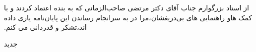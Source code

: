 


\begin{center}
\end{center}

از استاد بزرگوارم جناب آقای دکتر مرتضی صاحب‌الزمانی ‫ﮐﻪ‬ ‫ﺑﻪ‬ ‫ﺑﻨﺪﻩ‬ ‫ﺍﻋﺘﻤﺎﺩ‬ ‫ﮐﺮﺩﻧﺪ‬ ‫ﻭ‬ ‫ﺑﺎ‬ ‫ﮐﻤﮏ‬ ‫ﻫﺎ‬‫ﻭ‬ ‫ﺭﺍﻫﻨﻤﺎﯾﯽ‬ ‫ﻫﺎﯼ‬
‫ﺑﯽ‬‫ﺩﺭﯾﻐﺸﺎﻥ‪،‬‬‫ﻣﺮﺍ‬ ‫ﺩﺭ‬ ‫ﺑﻪ‬ ‫ﺳﺮﺍﻧﺠﺎﻡ‬ ‫ﺭﺳﺎﻧﺪﻥ‬ ‫ﺍﯾﻦ‬ ‫پایان‌نامه‬ ‫ﯾﺎﺭﯼ‬ ‫ﺩﺍﺩﻩ‬ ‫ﺍﻧﺪ‪،‬‬‫ﺗﺸﮑﺮ‬ ‫ﻭ‬ ‫ﻗﺪﺭﺩﺍﻧﯽ‬ ‫ﻣﯽ‬ ‫ﮐﻨﻢ‪.‬‬

‌جدید
